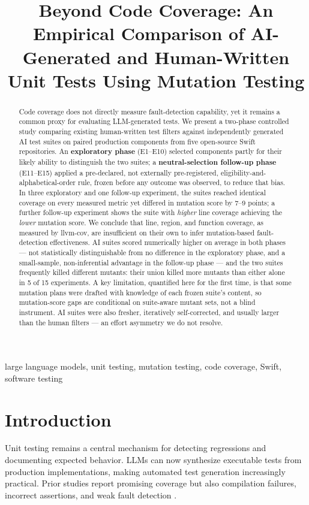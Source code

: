 \documentclass[10pt,conference]{IEEEtran}
\title{Beyond Code Coverage: An Empirical Comparison of AI-Generated and Human-Written Unit Tests Using Mutation Testing}
\author{\IEEEauthorblockN{Premal Mistry, Randhir Kumar}
\IEEEauthorblockA{Independent Researcher}}
\begin{document}
\maketitle

\begin{abstract}
Code coverage does not directly measure fault-detection capability, yet it remains a common proxy for evaluating LLM-generated tests. We present a two-phase controlled study comparing existing human-written test filters against independently generated AI test suites on paired production components from five open-source Swift repositories. An \textbf{exploratory phase} (E1--E10) selected components partly for their likely ability to distinguish the two suites; a \textbf{neutral-selection follow-up phase} (E11--E15) applied a pre-declared, not externally pre-registered, eligibility-and-alphabetical-order rule, frozen before any outcome was observed, to reduce that bias. In three exploratory and one follow-up experiment, the suites reached identical coverage on every measured metric yet differed in mutation score by 7--9 points; a further follow-up experiment shows the suite with \emph{higher} line coverage achieving the \emph{lower} mutation score. We conclude that line, region, and function coverage, as measured by llvm-cov, are insufficient on their own to infer mutation-based fault-detection effectiveness. AI suites scored numerically higher on average in both phases --- not statistically distinguishable from no difference in the exploratory phase, and a small-sample, non-inferential advantage in the follow-up phase --- and the two suites frequently killed different mutants: their union killed more mutants than either alone in 5 of 15 experiments. A key limitation, quantified here for the first time, is that some mutation plans were drafted with knowledge of each frozen suite's content, so mutation-score gaps are conditional on suite-aware mutant sets, not a blind instrument. AI suites were also fresher, iteratively self-corrected, and usually larger than the human filters --- an effort asymmetry we do not resolve.
\end{abstract}

\begin{IEEEkeywords}
large language models, unit testing, mutation testing, code coverage, Swift, software testing
\end{IEEEkeywords}

\section{Introduction}
Unit testing remains a central mechanism for detecting regressions and documenting expected behavior. LLMs can now synthesize executable tests from production implementations, making automated test generation increasingly practical. Prior studies report promising coverage but also compilation failures, incorrect assertions, and weak fault detection \cite{yuan2023}.
\end{document}
